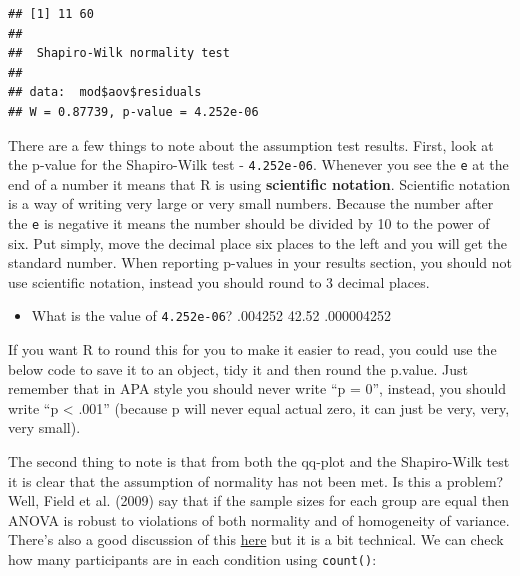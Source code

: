 \documentclass[]{book}
\newenvironment{Shaded}{\begin{snugshade}}{\end{snugshade}}
\newcommand{\CommentTok}[1]{\textcolor[rgb]{0.56,0.35,0.01}{\textit{#1}}}
\newcommand{\DataTypeTok}[1]{\textcolor[rgb]{0.13,0.29,0.53}{#1}}
\newcommand{\DecValTok}[1]{\textcolor[rgb]{0.00,0.00,0.81}{#1}}
\newcommand{\KeywordTok}[1]{\textcolor[rgb]{0.13,0.29,0.53}{\textbf{#1}}}
\newcommand{\NormalTok}[1]{#1}
\newcommand{\OperatorTok}[1]{\textcolor[rgb]{0.81,0.36,0.00}{\textbf{#1}}}
\newcommand{\StringTok}[1]{\textcolor[rgb]{0.31,0.60,0.02}{#1}}
\providecommand{\tightlist}{%
  \setlength{\itemsep}{0pt}\setlength{\parskip}{0pt}}
\begin{document}
\begin{verbatim}
## [1] 11 60
## 
##  Shapiro-Wilk normality test
## 
## data:  mod$aov$residuals
## W = 0.87739, p-value = 4.252e-06
\end{verbatim}

There are a few things to note about the assumption test results. First, look at the p-value for the Shapiro-Wilk test - \texttt{4.252e-06}. Whenever you see the \texttt{e} at the end of a number it means that R is using \textbf{scientific notation}. Scientific notation is a way of writing very large or very small numbers. Because the number after the \texttt{e} is negative it means the number should be divided by 10 to the power of six. Put simply, move the decimal place six places to the left and you will get the standard number. When reporting p-values in your results section, you should not use scientific notation, instead you should round to 3 decimal places.

\begin{itemize}
\tightlist
\item
  What is the value of \texttt{4.252e-06}? .004252 42.52 .000004252
\end{itemize}

If you want R to round this for you to make it easier to read, you could use the below code to save it to an object, tidy it and then round the p.value. Just remember that in APA style you should never write ``p = 0'', instead, you should write ``p \textless{} .001'' (because p will never equal actual zero, it can just be very, very, very small).

\begin{Shaded}
\end{Shaded}

The second thing to note is that from both the qq-plot and the Shapiro-Wilk test it is clear that the assumption of normality has not been met. Is this a problem? Well, Field et al. (2009) say that if the sample sizes for each group are equal then ANOVA is robust to violations of both normality and of homogeneity of variance. There's also a good discussion of this \href{https://link.springer.com/article/10.3758/s13428-017-0918-2}{here} but it is a bit technical. We can check how many participants are in each condition using \texttt{count()}:
\end{document}
